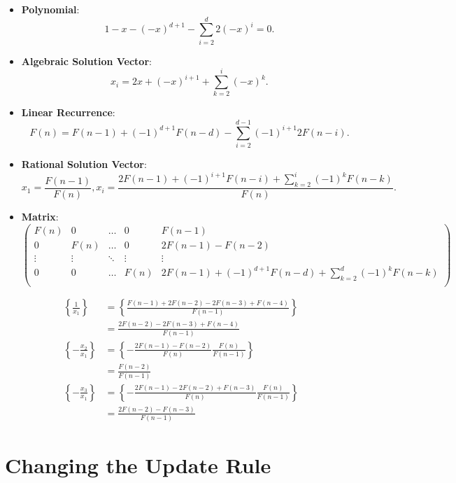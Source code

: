 \documentclass[english,version-2020-11]{uzl-thesis}
\begin{document}
\begin{itemize}
  \item \textbf{Polynomial}:
    \[
      1 - x - (-x)^{d+1} - \sum_{i = 2}^{d} 2 (-x)^{i} = 0.
    \]
  \item \textbf{Algebraic Solution Vector}:
    \[
      x_i = 2x + (-x)^{i+1} + \sum_{k=2}^{i} (-x)^{k}.
    \]
  \item \textbf{Linear Recurrence}:
    \[
      F(n) = F(n - 1) + (-1)^{d+1} F(n - d) - \sum_{i=2}^{d - 1} (-1)^{i+1} 2 F(n - i).
    \]
  \item \textbf{Rational Solution Vector}:
    \[
      x_1 = \frac{F(n - 1)}{F(n)}, x_i = \frac{2 F(n-1) + (-1)^{i+1} F(n - i) + \sum_{k=2}^i (-1)^k F(n-k)}{F(n)}.
    \]
  \item \textbf{Matrix}:
    \[\left(\begin{array}{cccc|c}
      F(n)   & 0      & \dots  & 0      & F(n - 1) \\
        0    & F(n)   & \dots  & 0      & 2 F(n - 1) - F(n - 2) \\
      \vdots & \vdots & \ddots & \vdots & \vdots   \\
        0    & 0      & \dots  & F(n)   & 2 F(n-1) + (-1)^{d+1} F(n - d) + \sum_{k=2}^d (-1)^k F(n-k) \\
    \end{array}\right)\]
\end{itemize}

\begin{example}
  \begin{align*}
    \left\{ \frac{1}{x_1} \right\}
    & = \left\{ \frac{F(n - 1) + 2 F(n - 2) - 2 F(n - 3) + F(n - 4)}{F(n - 1)} \right\} \\
    & = \frac{2 F(n - 2) - 2 F(n - 3) + F(n - 4)}{F(n - 1)} \\
    \left\{ -\frac{x_2}{x_1} \right\}
    & = \left\{ -\frac{2 F(n - 1) - F(n - 2)}{F(n)} \frac{F(n)}{F(n - 1)} \right\} \\
    & = \frac{F(n - 2)}{F(n - 1)} \\
    \left\{ -\frac{x_3}{x_1} \right\}
    & = \left\{ -\frac{2 F(n - 1) - 2 F(n - 2) + F(n - 3)}{F(n)} \frac{F(n)}{F(n - 1)} \right\} \\
    & = \frac{2 F(n - 2) - F(n - 3)}{F(n - 1)}
  \end{align*}
\end{example}

\section{Changing the Update Rule}
\end{document}
